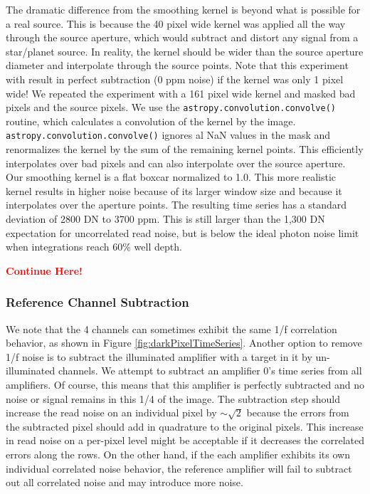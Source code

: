 \documentclass{aastex62}
\begin{document}
The dramatic difference from the smoothing kernel is beyond what is possible for a real source.
This is because the 40 pixel wide kernel was applied all the way through the source aperture, which would subtract and distort any signal from a star/planet source.
In reality, the kernel should be wider than the source aperture diameter and interpolate through the source points.
Note that this experiment with result in perfect subtraction (0 ppm noise) if the kernel was only 1 pixel wide!
We repeated the experiment with a 161 pixel wide kernel and masked bad pixels and the source pixels.
We use the \texttt{astropy.convolution.convolve()} routine, which calculates a convolution of the kernel by the image.
\texttt{astropy.convolution.convolve()} ignores al NaN values in the mask and renormalizes the kernel by the sum of the remaining kernel points.
This efficiently interpolates over bad pixels and can also interpolate over the source aperture.
Our smoothing kernel is a flat boxcar normalized to 1.0.
This more realistic kernel results in higher noise because of its larger window size and because it interpolates over the aperture points.
The resulting time series has a standard deviation of 2800 DN to 3700 ppm.
This is still larger than the 1,300 DN expectation for uncorrelated read noise, but is below the ideal photon noise limit when integrations reach 60\% well depth.

\textcolor{red}{\bf Continue Here!}

\subsubsection{Reference Channel Subtraction}
We note that the 4 channels can sometimes exhibit the same 1/f correlation behavior, as shown in Figure \ref{fig:darkPixelTimeSeries}.
Another option to remove 1/f noise is to subtract the illuminated amplifier with a target in it by un-illuminated channels.
We attempt to subtract an amplifier 0's time series from all amplifiers.
Of course, this means that this amplifier is perfectly subtracted and no noise or signal remains in this 1/4 of the image.
The subtraction step should increase the read noise on an individual pixel by $\sim \sqrt{2}$ because the errors from the subtracted pixel should add in quadrature to the original pixels.
This increase in read noise on a per-pixel level might be acceptable if it decreases the correlated errors along the rows.
On the other hand, if the each amplifier exhibits its own individual correlated noise behavior, the reference amplifier will fail to subtract out all correlated noise and may introduce more noise.
\end{document}
